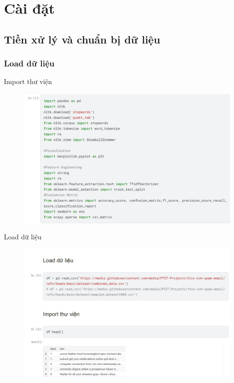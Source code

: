 \documentclass[serif, aspectratio=169]{beamer}
\begin{document}
	\section{Cài đặt}
	\subsection{Tiền xử lý và chuẩn bị dữ liệu}
	\subsubsection{Load dữ liệu}
	\begin{frame}{Import thư viện}
		\begin{figure}
			\centering
			\includegraphics[width=0.7\linewidth]{pic/import-libraries.png}
			\label{fig:import-libraries}
		\end{figure}
	\end{frame}
	
	\begin{frame}{Load dữ liệu}
		\begin{figure}
			\centering
			\includegraphics[width=0.8\linewidth]{pic/load-data.png}
			\label{fig:load-data}
		\end{figure}
	\end{frame}
	
\end{document}
